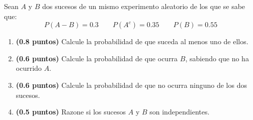 
Sean $A$ y $B$ dos sucesos de un mismo experimento aleatorio de los que
se sabe que:
\[
P(A-B)=0.3\qquad P(A^c)=0.35\qquad P(B)=0.55
\]
\begin{enumerate}[label=\alph*)]
  \item \textbf{(0.8 puntos)} Calcule la probabilidad de que suceda al menos
  uno de ellos.
  \item \textbf{(0.6 puntos)} Calcule la probabilidad de que ocurra $B$,
  sabiendo que no ha ocurrido $A$.
  \item \textbf{(0.6 puntos)} Calcule la probabilidad de que no ocurra
  ninguno de los dos sucesos.
  \item \textbf{(0.5 puntos)} Razone si los sucesos $A$ y $B$ son independientes.
\end{enumerate}
